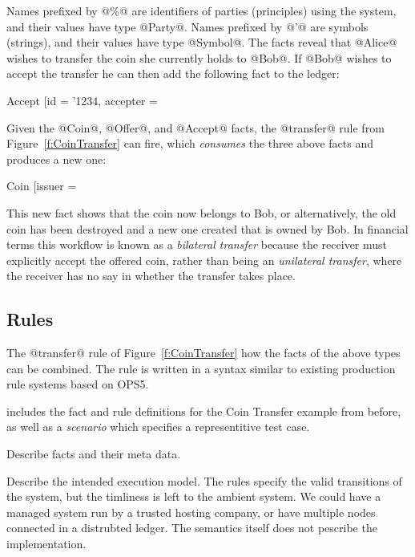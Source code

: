 Names prefixed by @\%@ are identifiers of parties (principles) using the system, and their values have type @Party@. Names prefixed by @'@ are symbols (strings), and their values have type @Symbol@. The facts reveal that @Alice@ wishes to transfer the coin she currently holds to @Bob@. If @Bob@ wishes to accept the transfer he can then add the following fact to the ledger:
\begin{small}
\begin{code}
 Accept [id = '1234, accepter = %
\end{code}
\end{small}

Given the @Coin@, @Offer@, and @Accept@ facts, the @transfer@ rule from Figure~\ref{f:CoinTransfer} can fire, which \emph{consumes} the three above facts and produces a new one:
\begin{small}
\begin{code}
 Coin [issuer = %
\end{code}
\end{small}

This new fact shows that the coin now belongs to Bob, or alternatively, the old coin has been destroyed and a new one created that is owned by Bob. In financial terms this workflow is known as a \emph{bilateral transfer} because the receiver must explicitly accept the offered coin, rather than being an \emph{unilateral transfer}, where the receiver has no say in whether the transfer takes place.


\subsection{Rules}
The @transfer@ rule of Figure~\ref{f:CoinTransfer} how the facts of the above types can be combined. The rule is written in a syntax similar to existing production rule systems based on OPS5.







includes the fact and rule definitions for the Coin Transfer example from before, as well as a \emph{scenario} which specifies a representitive test case.

Describe facts and their meta data.

Describe the intended execution model. The rules specify the valid transitions of the system, but the timliness is left to the ambient system. We could have a managed system run by a trusted hosting company, or have multiple nodes connected in a distrubted ledger. The semantics itself does not pescribe the implementation.


